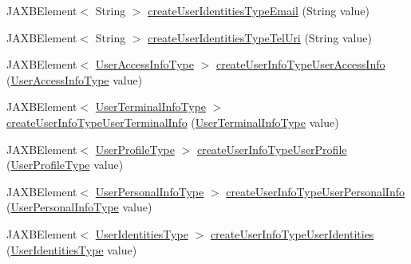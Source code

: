 \begin{DoxyCompactItemize}
\item 
JAXBElement$<$ String $>$ \hyperlink{classcom_1_1telefonica_1_1schemas_1_1unica_1_1rest_1_1directory_1_1v1_1_1ObjectFactory_a399f18868c529c8d408937e76864e39b}{createUserIdentitiesTypeEmail} (String value)
\item 
JAXBElement$<$ String $>$ \hyperlink{classcom_1_1telefonica_1_1schemas_1_1unica_1_1rest_1_1directory_1_1v1_1_1ObjectFactory_a9a5a163d5aa758b100f675aadd2fa6fb}{createUserIdentitiesTypeTelUri} (String value)
\item 
JAXBElement$<$ \hyperlink{classcom_1_1telefonica_1_1schemas_1_1unica_1_1rest_1_1directory_1_1v1_1_1UserAccessInfoType}{UserAccessInfoType} $>$ \hyperlink{classcom_1_1telefonica_1_1schemas_1_1unica_1_1rest_1_1directory_1_1v1_1_1ObjectFactory_a4edcb13df0f9eeeb98bb5ac62b1cd03f}{createUserInfoTypeUserAccessInfo} (\hyperlink{classcom_1_1telefonica_1_1schemas_1_1unica_1_1rest_1_1directory_1_1v1_1_1UserAccessInfoType}{UserAccessInfoType} value)
\item 
JAXBElement$<$ \hyperlink{classcom_1_1telefonica_1_1schemas_1_1unica_1_1rest_1_1directory_1_1v1_1_1UserTerminalInfoType}{UserTerminalInfoType} $>$ \hyperlink{classcom_1_1telefonica_1_1schemas_1_1unica_1_1rest_1_1directory_1_1v1_1_1ObjectFactory_a4d92edce1a60caf91a69929b7f27f071}{createUserInfoTypeUserTerminalInfo} (\hyperlink{classcom_1_1telefonica_1_1schemas_1_1unica_1_1rest_1_1directory_1_1v1_1_1UserTerminalInfoType}{UserTerminalInfoType} value)
\item 
JAXBElement$<$ \hyperlink{classcom_1_1telefonica_1_1schemas_1_1unica_1_1rest_1_1directory_1_1v1_1_1UserProfileType}{UserProfileType} $>$ \hyperlink{classcom_1_1telefonica_1_1schemas_1_1unica_1_1rest_1_1directory_1_1v1_1_1ObjectFactory_ac3db01133217e9bfaed4162f26ffcd2c}{createUserInfoTypeUserProfile} (\hyperlink{classcom_1_1telefonica_1_1schemas_1_1unica_1_1rest_1_1directory_1_1v1_1_1UserProfileType}{UserProfileType} value)
\item 
JAXBElement$<$ \hyperlink{classcom_1_1telefonica_1_1schemas_1_1unica_1_1rest_1_1directory_1_1v1_1_1UserPersonalInfoType}{UserPersonalInfoType} $>$ \hyperlink{classcom_1_1telefonica_1_1schemas_1_1unica_1_1rest_1_1directory_1_1v1_1_1ObjectFactory_a49629f417f2c5a0fc5f4cab0809f684b}{createUserInfoTypeUserPersonalInfo} (\hyperlink{classcom_1_1telefonica_1_1schemas_1_1unica_1_1rest_1_1directory_1_1v1_1_1UserPersonalInfoType}{UserPersonalInfoType} value)
\item 
JAXBElement$<$ \hyperlink{classcom_1_1telefonica_1_1schemas_1_1unica_1_1rest_1_1directory_1_1v1_1_1UserIdentitiesType}{UserIdentitiesType} $>$ \hyperlink{classcom_1_1telefonica_1_1schemas_1_1unica_1_1rest_1_1directory_1_1v1_1_1ObjectFactory_a56bcce11f4d5c15be12b0cc3def3177c}{createUserInfoTypeUserIdentities} (\hyperlink{classcom_1_1telefonica_1_1schemas_1_1unica_1_1rest_1_1directory_1_1v1_1_1UserIdentitiesType}{UserIdentitiesType} value)

\end{DoxyCompactItemize}
